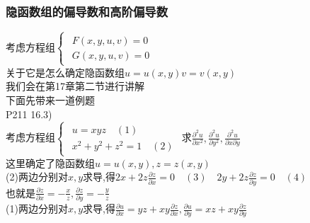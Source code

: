 \documentclass[xetex]{beamer}
\begin{document}
\begin{frame}
	\frametitle{隐函数组的偏导数和高阶偏导数}

	考虑方程组$\begin{cases} 
		\begin{matrix}
			F(x,y,u,v)=0\\
			G(x,y,u,v)=0
		\end{matrix}
	\end{cases}
	$\\关于它是怎么确定隐函数组$u=u(x,y)$\quad$v=v(x,y)$\\
	我们会在第17章第二节进行讲解\\
	下面先带来一道例题\\
	P211 16.3)\\
	考虑方程组$\begin{cases} 
	\begin{matrix}
	u=xyz\quad(1)\\
	x^2+y^2+z^2=1\quad(2)
	\end{matrix}
	\end{cases}$\quad 求$\frac{\partial^2 u}{\partial x^2},\frac{\partial^2 u}{\partial y^2},\frac{\partial^2 u}{\partial x\partial y}$\\
	这里确定了隐函数组$u=u(x,y),z=z(x,y)$\\
	(2)两边分别对$x,y$求导,得$2x+2z\frac{\partial z}{\partial x}=0\quad(3)\quad 2y+2z\frac{\partial z}{\partial y}=0\quad(4)$\\ \pause
	也就是$\frac{\partial z}{\partial x}=-\frac{x}{z},\frac{\partial z}{\partial y}=-\frac{y}{z}$\\ \pause
	(1)两边分别对$x,y$求导,得$\frac{\partial u}{\partial x}=yz+xy\frac{\partial z}{\partial x},\frac{\partial u}{\partial y}=xz+xy\frac{\partial z}{\partial y}$\\ 
	
\end{frame}
\end{document}
